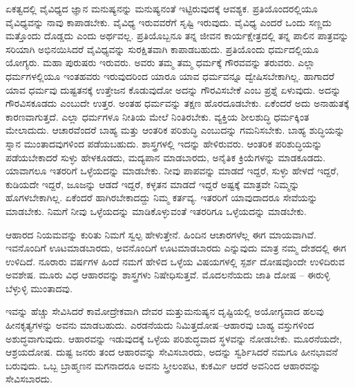 ಏಕತ್ವದಲ್ಲಿ ವೈವಿಧ್ಯದ ಜ್ಞಾನ ಮನುಷ್ಯನನ್ನು ಮನುಷ್ಯನಂತೆ ಇಟ್ಟಿರುವುದಕ್ಕೆ ಆವಶ್ಯಕ. ಪ್ರತಿಯೊಂದರಲ್ಲಿಯೂ ವೈವಿಧ್ಯವನ್ನು ನಾವು ಕಾಪಾಡಬೇಕು. ವೈವಿಧ್ಯ ಇರುವವರೆಗೆ ಸೃಷ್ಟಿ ಇರುವುದು. ವೈವಿಧ್ಯ ಎಂದರೆ ಒಂದು ಸಣ್ಣದು ಮತ್ತೊಂದು ದೊಡ್ಡದು ಎಂದು ಅರ್ಥವಲ್ಲ. ಪ್ರತಿಯೊಬ್ಬನೂ ತನ್ನ ಜೀವನ ಕಾರ್ಯಕ್ಷೇತ್ರದಲ್ಲಿ ತನ್ನ ಪಾಲಿನ ಪಾತ್ರವನ್ನು ಸರಿಯಾಗಿ ಅಭಿನಯಿಸಿದರೆ ವೈವಿಧ್ಯವನ್ನು ಸುರಕ್ಷಿತವಾಗಿ ಕಾಪಾಡಬಹುದು. ಪ್ರತಿಯೊಂದು ಧರ್ಮದಲ್ಲಿಯೂ ಯೋಗ್ಯರು. ಮಹಾ ಪುರುಷರು ಇರುವರು. ಅವರು ತಮ್ಮ ತಮ್ಮ ಧರ್ಮಕ್ಕೆ ಗೌರವವನ್ನು ತರುವರು. ಎಲ್ಲಾ ಧರ್ಮಗಳಲ್ಲಿಯೂ ಇಂತಹವರು ಇರುವುದರಿಂದ ಯಾರೂ ಯಾವ ಧರ್ಮವನ್ನೂ ದ್ವೇಷಿಸಬೇಕಾಗಿಲ್ಲ. ಹಾಗಾದರೆ ಯಾವ ಧರ್ಮವು ದುಷ್ಟತನಕ್ಕೆ ಉತ್ತೇಜನ ಕೊಡುವುದೋ ಅದನ್ನು ಗೌರವಿಸಬೇಕೆ ಎಂಬ ಪ್ರಶ್ನೆ ಏಳುವುದು. ಅದನ್ನು ಗೌರವಿಸಕೂಡದು ಎಂಬುದೇ ಉತ್ತರ. ಅಂತಹ ಧರ್ಮವನ್ನು ತಕ್ಷಣ ಹೊರದೂಡಬೇಕು. ಏಕೆಂದರೆ ಅದು ಅನಾಹುತಕ್ಕೆ ಕಾರಣವಾಗುತ್ತದೆ. ಎಲ್ಲಾ ಧರ್ಮಗಳೂ ನೀತಿಯ ಮೇಲೆ ನಿಂತಿರಬೇಕು. ವ್ಯಕ್ತಿಯ ಶೀಲಶುದ್ಧಿ ಧರ್ಮಕ್ಕಿಂತ ಮೇಲಾದುದು. ಆಚಾರವೆಂದರೆ ಬಾಹ್ಯ ಮತ್ತು ಆಂತರಿಕ ಪರಿಶುದ್ಧಿ ಎಂಬುದನ್ನು ಗಮನಿಸಬೇಕು. ಬಾಹ್ಯ ಶುದ್ಧಿಯನ್ನು ಸ್ನಾನ ಮುಂತಾದವುಗಳಿಂದ ಪಡೆಯಬಹುದು. ಶಾಸ್ತ್ರಗಳಲ್ಲಿ ಇದನ್ನು ಹೇಳಿರುವರು. ಆಂತರಿಕ ಪರಿಶುದ್ಧಿಯನ್ನು ಪಡೆಯಬೇಕಾದರೆ ಸುಳ್ಳು ಹೇಳಕೂಡದು, ಮದ್ಯಪಾನ ಮಾಡಬಾರದು, ಅನೈತಿಕ ಕ್ರಿಯೆಗಳನ್ನು ಮಾಡಕೂಡದು. ಯಾವಾಗಲೂ ಇತರರಿಗೆ ಒಳ್ಳೆಯದನ್ನು ಮಾಡಬೇಕು. ನೀವು ಪಾಪವನ್ನು ಮಾಡದೆ ಇದ್ದರೆ, ಸುಳ್ಳು ಹೇಳದೆ ಇದ್ದರೆ, ಕುಡಿಯದೇ ಇದ್ದರೆ, ಜೂಜನ್ನು ಆಡದೆ ಇದ್ದರೆ, ಕಳ್ಳತನ ಮಾಡದೆ ಇದ್ದರೆ ಅಷ್ಟಕ್ಕೆ ಮಾತ್ರವೇ ನಿಮ್ಮನ್ನು ಹೊಗಳಬೇಕಾಗಿಲ್ಲ. ಏಕೆಂದರೆ ಹಾಗಿರಬೇಕಾದದ್ದು ನಿಮ್ಮ ಕರ್ತವ್ಯ. ಇತರರಿಗೆ ಯಾವುದಾದರೂ ಸೇವೆಯನ್ನು ಮಾಡಬೇಕು. ನಿಮಗೆ ನೀವು ಒಳ್ಳೆಯದನ್ನು ಮಾಡಿಕೊಳ್ಳುವಂತೆ ಇತರರಿಗೂ ಒಳ್ಳೆಯದನ್ನು ಮಾಡಬೇಕು.

ಆಹಾರದ ನಿಯಮವನ್ನು ಕುರಿತು ನಿಮಗೆ ಸ್ವಲ್ಪ ಹೇಳುತ್ತೇನೆ. ಹಿಂದಿನ ಆಚಾರಗಳೆಲ್ಲ ಈಗ ಮಾಯವಾಗಿವೆ. ಇವನೊಂದಿಗೆ ಊಟಮಾಡಬಾರದು, ಅವನೊಂದಿಗೆ ಊಟಮಾಡಬಾರದು ಎನ್ನುವುದು ಮಾತ್ರ ನಮ್ಮ ದೇಶದಲ್ಲಿ ಈಗ ಉಳಿದಿದೆ. ನೂರಾರು ವರ್ಷಗಳ ಹಿಂದೆ ನಮಗೆ ಹೇಳಿದ ಒಳ್ಳೆಯ ವಿಷಯಗಳಲ್ಲಿ ಸ್ಪರ್ಶ ದೋಷವೊಂದೇ ಉಳಿದಿರುವ ಅವಶೇಷ. ಮೂರು ವಿಧ ಆಹಾರವನ್ನು ಶಾಸ್ತ್ರಗಳು ನಿಷೇಧಿಸುತ್ತವೆ. ಮೊದಲನೆಯದು ಜಾತಿ ದೋಷ – ಈರುಳ್ಳಿ ಬೆಳ್ಳುಳ್ಳಿ ಮುಂತಾದವು.

ಇವನ್ನು ಹೆಚ್ಚು ಸೇವಿಸಿದರೆ ಕಾಮೋದ್ರೇಕವಾಗಿ ದೇವರ ಮತ್ತು\break ಮನುಷ್ಯನ ದೃಷ್ಟಿಯಲ್ಲಿ ಅಯೋಗ್ಯವಾದ ಹಲವು ಹೀನಕೃತ್ಯಗಳನ್ನು ಅವನು ಮಾಡಬಹುದು. ಎರಡನೆಯದು ನಿಮಿತ್ತದೋಷ–ಆಹಾರವು ಬಾಹ್ಯ ವಸ್ತುಗಳಿಂದ ಅಶುದ್ಧವಾಗುವುದು. ಆಹಾರವನ್ನು ಇಡುವುದಕ್ಕೆ ಒಳ್ಳೆಯ ಪರಿಶುದ್ಧವಾದ ಸ್ಥಳವನ್ನು ನೋಡಬೇಕು. ಮೂರನೆಯದೇ, ಆಶ್ರಯದೋಷ. ದುಷ್ಟ ಜನರು ತಂದ ಆಹಾರವನ್ನು ಸೇವಿಸಬಾರದು, ಅದನ್ನು ಸ್ವರ್ಶಿಸಿದರೆ ನಮಗೂ ಹೀನಭಾವನೆ ಬರುವುದು. ಒಬ್ಬ ಬ್ರಾಹ್ಮಣನ ಮಗನಾದರೂ ಅವನು ಸ್ತ್ರೀಲಂಪಟ, ಕುಕರ್ಮಿ ಆದರೆ ಅವನಿಂದ ಆಹಾರವನ್ನು ಸೇವಿಸಬಾರದು.

